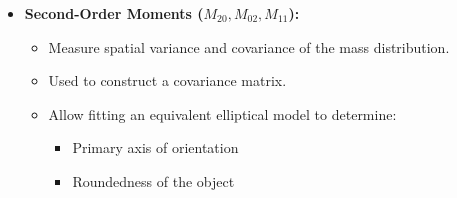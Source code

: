 \documentclass[12pt]{article}
\begin{document}
\begin{itemize}
    \item \textbf{Second-Order Moments ($M_{20}, M_{02}, M_{11}$):}
          \begin{itemize}
              \item Measure spatial variance and covariance of the mass distribution.
              \item Used to construct a covariance matrix.
              \item Allow fitting an equivalent elliptical model to determine:
                    \begin{itemize}
                        \item Primary axis of orientation
                        \item Roundedness of the object
                    \end{itemize}
          \end{itemize}
\end{itemize}
\end{document}
